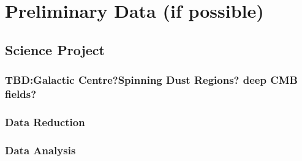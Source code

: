 \chapter{Preliminary Data (if possible)}

\section{Science Project}
  \subsection{TBD:Galactic Centre?Spinning Dust Regions? deep CMB fields?}

  \subsection{Data Reduction}

  \subsection{Data Analysis}
  


  



